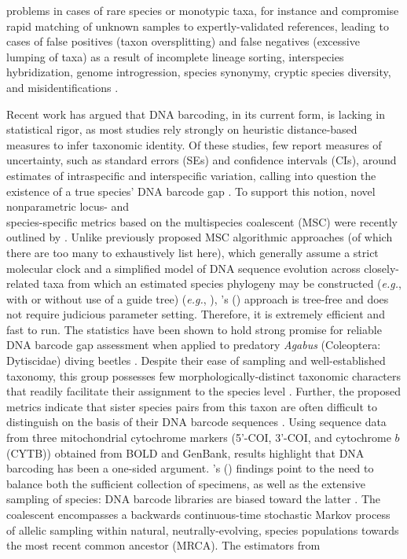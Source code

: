 \documentclass[12pt]{article}
\begin{document}
problems in cases of rare species or monotypic taxa, for instance \citep{ahrens2016rarity} and compromise rapid matching of unknown samples to expertly-validated references, leading to cases of false positives (taxon oversplitting) and false negatives (excessive lumping of taxa) as a result of incomplete lineage sorting, interspecies hybridization, genome introgression, species synonymy, cryptic species diversity, and misidentifications \citep{hubert2015dna, phillips2022lack}.

Recent work has argued that DNA barcoding, in its current form, is lacking in statistical rigor, as most studies rely strongly on heuristic distance-based measures to infer taxonomic identity. Of these studies, few report measures of uncertainty, such as standard errors (SEs) and confidence intervals (CIs), around estimates of intraspecific and interspecific  variation, calling into question the existence of a true species' DNA barcode gap \citep{candek2015dna, phillips2022lack}. To support this notion, novel nonparametric locus- and \\ species-specific metrics based on the multispecies coalescent (MSC) were recently outlined by \citet{phillips2024measure}. Unlike previously proposed MSC algorithmic approaches (of which there are too many to exhaustively list here), which generally assume a strict molecular clock and a simplified model of DNA sequence evolution across closely-related taxa from which an estimated species phylogeny may be constructed (\textit{e.g.}, with or without use of a guide tree) (\textit{e.g.}, \citet{rannala2003bayes, rannala2017efficient, yang2010bayesian, yang2014unguided, yang2017bayesian}), \citeauthor{phillips2024measure}'s (\citeyear{phillips2024measure}) approach is tree-free and does not require judicious parameter setting. Therefore, it is extremely efficient and  fast to run. The statistics have been shown to hold strong promise for reliable DNA barcode gap assessment when applied to predatory \textit{Agabus}  (Coleoptera: Dytiscidae) diving beetles \citep{phillips2024measure}. Despite their ease of sampling and well-established taxonomy, this group possesses few morphologically-distinct taxonomic characters that readily facilitate their assignment to the species level \citep{bergsten2012effect}. Further, the proposed metrics indicate that sister species pairs from this taxon are often difficult to distinguish on the basis of their DNA barcode sequences \citep{phillips2024measure}. Using sequence data from three mitochondrial cytochrome markers (5'-COI, 3'-COI, and cytochrome $b$ (CYTB)) obtained from BOLD and GenBank, results highlight that DNA barcoding has been a one-sided argument. \citeauthor{phillips2024measure}'s (\citeyear{phillips2024measure}) findings point to the need to balance both the sufficient collection of specimens, as well as the extensive sampling of species: DNA barcode libraries are biased toward the latter \citep{phillips2022lack}. The coalescent \citep{kingman1982coalescent, kingman1982genealogy} encompasses a backwards continuous-time stochastic Markov process of allelic sampling within natural, neutrally-evolving, species populations towards the most recent common ancestor (MRCA). The estimators from 
\end{document}
